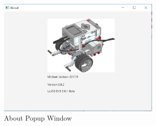 \begin{figure}[H]
	\centering
	\includegraphics[width=80mm]{About.png}  
	\caption{About Popup Window}
	\label{fig:other_about}
\end{figure}
